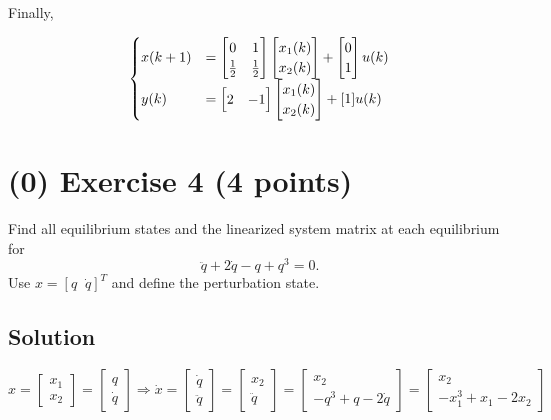 \documentclass[12pt,a4paper]{article}
\begin{document}
Finally, 

\[
\begin{cases}
	x(k + 1) &= \begin{bmatrix}
		0 & 1 \\
		{1\over2} & {1\over2}
	\end{bmatrix} \begin{bmatrix}
	x_1(k) \\ x_2(k)
	\end{bmatrix} + \begin{bmatrix}
	0 \\ 1
	\end{bmatrix}u(k) \\
	y(k) &= \begin{bmatrix}
		2 & -1
	\end{bmatrix} \begin{bmatrix}
	x_1(k) \\ x_2(k) 
	\end{bmatrix} + [1] u(k)
\end{cases}
\]


\vspace{3cm}
\vfill
\clearpage
\section*{(0) Exercise 4 \hfill {\normalsize (4 points)}}
Find all equilibrium states and the linearized system matrix at each equilibrium for
\[
\ddot q+2\dot q-q+q^3=0.
\]
Use $x=[q\;\;\dot q]^T$ and define the perturbation state.
\subsection*{Solution}

\[
x = \begin{bmatrix}
	x_1 \\ x_2
\end{bmatrix}  = 
\begin{bmatrix}
	q \\ \dot q 
\end{bmatrix} \Rightarrow \dot x =\begin{bmatrix}
\dot q \\ \ddot q 
\end{bmatrix} = \begin{bmatrix}
x_2 \\ \ddot q
\end{bmatrix} = \begin{bmatrix}	
x_2 \\ -q^3 + q - 2 \dot q
\end{bmatrix} = \begin{bmatrix}
x_2 \\ -x_1^3 + x_1 - 2x_2
\end{bmatrix}
\]
\end{document}
